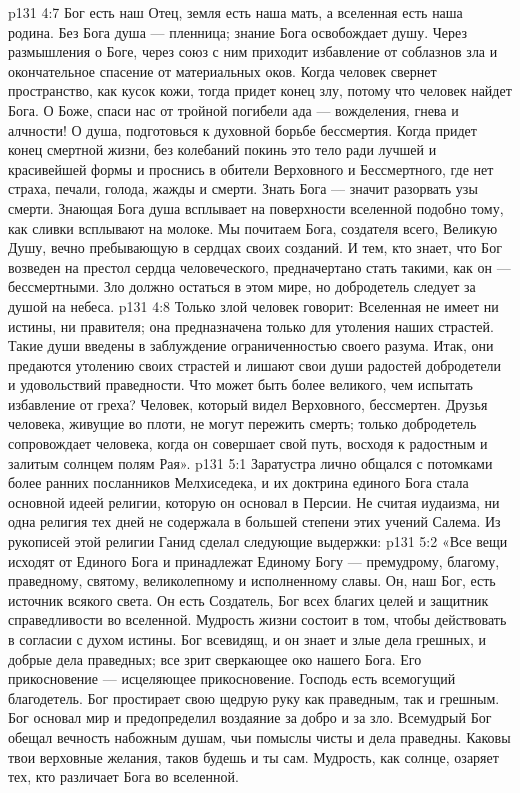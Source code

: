 \vs p131 4:7 Бог есть наш Отец, земля есть наша мать, а вселенная есть наша родина. Без Бога душа --- пленница; знание Бога освобождает душу. Через размышления о Боге, через союз с ним приходит избавление от соблазнов зла и окончательное спасение от материальных оков. Когда человек свернет пространство, как кусок кожи, тогда придет конец злу, потому что человек найдет Бога. О Боже, спаси нас от тройной погибели ада --- вожделения, гнева и алчности! О душа, подготовься к духовной борьбе бессмертия. Когда придет конец смертной жизни, без колебаний покинь это тело ради лучшей и красивейшей формы и проснись в обители Верховного и Бессмертного, где нет страха, печали, голода, жажды и смерти. Знать Бога --- значит разорвать узы смерти. Знающая Бога душа всплывает на поверхности вселенной подобно тому, как сливки всплывают на молоке. Мы почитаем Бога, создателя всего, Великую Душу, вечно пребывающую в сердцах своих созданий. И тем, кто знает, что Бог возведен на престол сердца человеческого, предначертано стать такими, как он --- бессмертными. Зло должно остаться в этом мире, но добродетель следует за душой на небеса.
\vs p131 4:8 Только злой человек говорит: Вселенная не имеет ни истины, ни правителя; она предназначена только для утоления наших страстей. Такие души введены в заблуждение ограниченностью своего разума. Итак, они предаются утолению своих страстей и лишают свои души радостей добродетели и удовольствий праведности. Что может быть более великого, чем испытать избавление от греха? Человек, который видел Верховного, бессмертен. Друзья человека, живущие во плоти, не могут пережить смерть; только добродетель сопровождает человека, когда он совершает свой путь, восходя к радостным и залитым солнцем полям Рая».
\vs p131 5:1 Заратустра лично общался с потомками более ранних посланников Мелхиседека, и их доктрина единого Бога стала основной идеей религии, которую он основал в Персии. Не считая иудаизма, ни одна религия тех дней не содержала в большей степени этих учений Салема. Из рукописей этой религии Ганид сделал следующие выдержки:
\vs p131 5:2 \pc «Все вещи исходят от Единого Бога и принадлежат Единому Богу --- премудрому, благому, праведному, святому, великолепному и исполненному славы. Он, наш Бог, есть источник всякого света. Он есть Создатель, Бог всех благих целей и защитник справедливости во вселенной. Мудрость жизни состоит в том, чтобы действовать в согласии с духом истины. Бог всевидящ, и он знает и злые дела грешных, и добрые дела праведных; все зрит сверкающее око нашего Бога. Его прикосновение --- исцеляющее прикосновение. Господь есть всемогущий благодетель. Бог простирает свою щедрую руку как праведным, так и грешным. Бог основал мир и предопределил воздаяние за добро и за зло. Всемудрый Бог обещал вечность набожным душам, чьи помыслы чисты и дела праведны. Каковы твои верховные желания, таков будешь и ты сам. Мудрость, как солнце, озаряет тех, кто различает Бога во вселенной.
